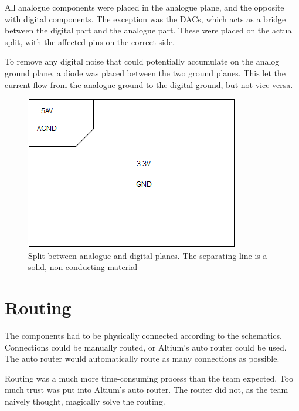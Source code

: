 All analogue components were placed in the analogue plane, and the opposite with digital components. 
The exception was the DACs, which acts as a bridge between the digital part and the analogue part. 
These were placed on the actual split, with the affected pins on the correct side.

To remove any digital noise that could potentially accumulate on the analog ground plane, a diode was placed between the two ground planes. 
This let the current flow from the analogue ground to the digital ground, but not vice versa.

\begin{figure}[h!]
\centering
\includegraphics[scale = 0.6]{images/Split_planes.png}
\caption{Split between analogue and digital planes. The separating line is a solid, non-conducting material}
\label{fig:Split planes}
\end{figure}

\section{Routing}
The components had to be physically connected according to the schematics.
Connections could be manually routed, or Altium's auto router could be used. 
The auto router would automatically route as many connections as possible.  

Routing was a much more time-consuming process than the team expected. 
Too much trust was put into Altium's auto router. 
The router did not, as the team naively thought, magically solve the routing. 

